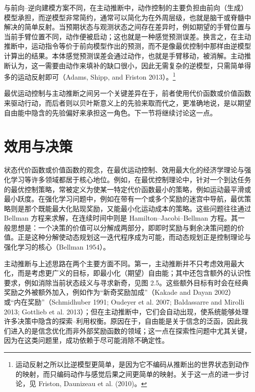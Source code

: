 与前向--逆向建模方案不同，在主动推断中，动作控制的主要负担由前向（生成）模型承担，而逆模型非常简约，通常可以简化为在外周层级，也就是脑干或脊髓中解决的简单反射。当预期状态与观测状态之间存在差异时，例如期望的手臂位置与当前手臂位置不同，动作便被启动；这也就是一种感觉预测误差。换言之，在主动推断中，运动指令等价于前向模型作出的预测，而不是像最优控制中那样由逆模型计算出的结果。本体感觉预测误差会通过动作，也就是手臂移动，被消解。主动推断认为，这一需要由动作来填补的缺口很小，因此无需复杂的逆模型，只需简单得多的运动反射即可（Adams, Shipp, and Friston 2013）。\footnote{运动反射之所以比逆模型更简单，是因为它不编码从推断出的世界状态到动作的映射，而只编码动作与感觉后果之间更简单的映射。关于这一点的进一步讨论，见 Friston, Daunizeau et al. (2010)。}

最优运动控制与主动推断之间另一个关键差异在于，前者使用代价函数或价值函数来驱动行动，而后者则以贝叶斯意义上的先验来取而代之，更准确地说，是以期望自由能中隐含的先验偏好来承担这一角色。下一节将继续讨论这一点。

\section{效用与决策}

状态代价函数或价值函数的观念，在最优运动控制、效用最大化的经济学理论与强化学习等许多领域都居于核心地位。例如，在最优控制理论中，针对一个到达任务的最优控制策略，常被定义为使某一特定代价函数最小的策略，例如运动最平滑或最小跃度。在强化学习问题中，例如在带有一个或多个奖励的迷宫中导航，最优策略则是那个既能最大化贴现奖励，又能最小化运动成本的策略。这些问题往往通过 Bellman 方程来求解，在连续时间中则是 Hamilton--Jacobi--Bellman 方程。其一般思想是：一个决策的价值可以分解成两部分，即即时奖励与剩余决策问题的价值。正是这种分解使动态规划这一迭代程序成为可能，而动态规划正是控制理论与强化学习的核心（Bellman 1954）。

主动推断与上述思路在两个主要方面不同。第一，主动推断并不只考虑效用最大化，而是考虑更广义的目标，即最小化（期望）自由能；其中还包含额外的认识性要求，例如消除当前状态歧义与寻求新奇，见图 2.5。这些额外目标有时会在经典奖励之外被额外加入，例如作为“新奇奖励加成”（Kakade and Dayan 2002）或“内在奖励”（Schmidhuber 1991; Oudeyer et al. 2007; Baldassarre and Mirolli 2013; Gottlieb et al. 2013）；但在主动推断中，它们会自动出现，使系统能够处理许多决策中隐含的探索--利用权衡。原因在于，自由能是关于信念的泛函，因此我们进入的是信念优化而非外部奖励函数的领域；这一点在探索性问题中尤其关键，因为在这类问题里，成功依赖于尽可能消除不确定性。

